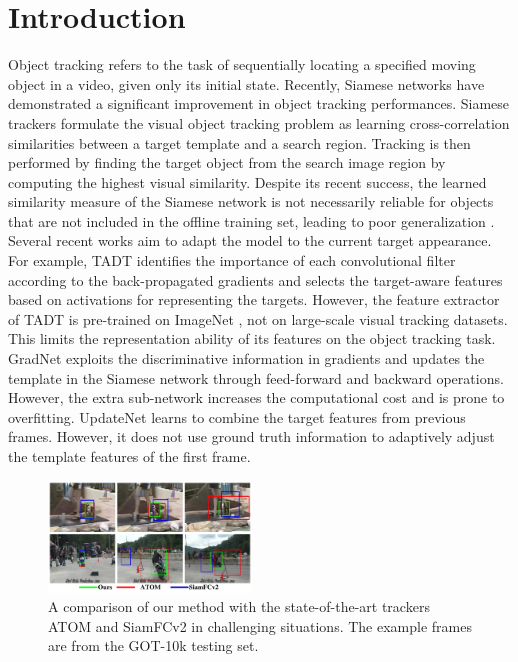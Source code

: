 \section{Introduction}
Object tracking refers to the task of sequentially locating a specified moving object in a video, given only its initial state. Recently, Siamese networks \cite{danelljan2019atom, bertinetto2016fully} have demonstrated a significant improvement in object tracking performances. Siamese trackers formulate the visual object tracking problem as learning cross-correlation similarities between a target template and a search region. Tracking is then performed by finding the target object from the search image region by computing the highest visual similarity. Despite its recent success, the learned similarity measure of the Siamese network is not necessarily reliable for objects that are not included in the offline training set, leading to poor generalization \cite{Bhat_2019_ICCV}. Several recent works aim to adapt the model to the current target appearance. For example, TADT \cite{Li_2019_CVPR} identifies the importance of each convolutional filter according to the back-propagated gradients and selects the target-aware features based on activations for representing the targets. However, the feature extractor of TADT is pre-trained on ImageNet \cite{russakovsky2015imagenet}, not on large-scale visual tracking datasets. This limits the representation ability of its features on the object tracking task. GradNet \cite{Li_2019_ICCV} exploits the discriminative information in gradients and updates the template in the Siamese network through feed-forward and backward operations. However, the extra sub-network increases the computational cost and is prone to overfitting. UpdateNet \cite{Zhang_2019_ICCV} learns to combine the target features from previous frames. However, it does not use ground truth information to adaptively adjust the template features of the first frame.

\begin{figure}[t]
    \centering
    \includegraphics[width=0.48\textwidth]{Img/MTP/got10k/visulization2.pdf}
    \vspace{-0.3cm}
    \caption{A comparison of our method with the state-of-the-art trackers ATOM \cite{danelljan2019atom} and SiamFCv2 \cite{bertinetto2016fully} in challenging situations. The example frames are from the GOT-10k \cite{huang2018got} testing set.}
    \vspace{-0.3cm}
    \label{fig:vis}
\end{figure}

